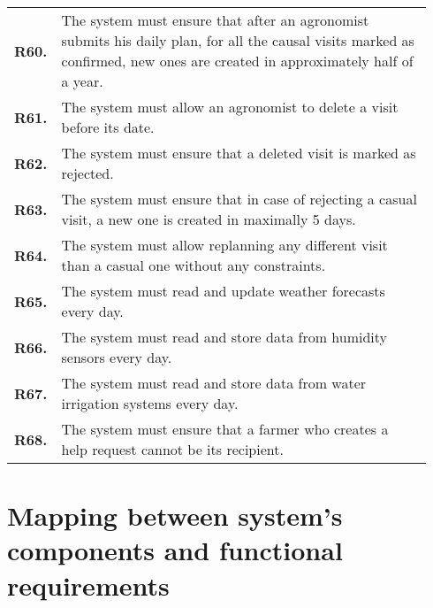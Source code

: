 \begin{longtable}{@{}p{0.06\linewidth} p{0.88\linewidth}}
	\textbf{R60.} & The system must ensure that after an agronomist submits his daily plan, for all the causal visits marked as confirmed, new ones are created in approximately half of a year.\\
	\textbf{R61.} & The system must allow an agronomist to delete a visit before its date.\\
	\textbf{R62.} & The system must ensure that a deleted visit is marked as rejected.\\
	\textbf{R63.} & The system must ensure that in case of rejecting a casual visit, a new one is created in maximally 5 days.\\
	\textbf{R64.} & The system must allow replanning any different visit than a casual one without any constraints.\\
	
	\textbf{R65.} & The system must read and update weather forecasts every day. \\
	\textbf{R66.} & The system must read and store data from humidity sensors every day. \\
	\textbf{R67.} & The system must read and store data from water irrigation systems every day. \\
	\textbf{R68.} & The system must ensure that a farmer who creates a help request cannot be its recipient.\\
		
	\bottomrule
\end{longtable}

\section{Mapping between system's components and functional requirements}

